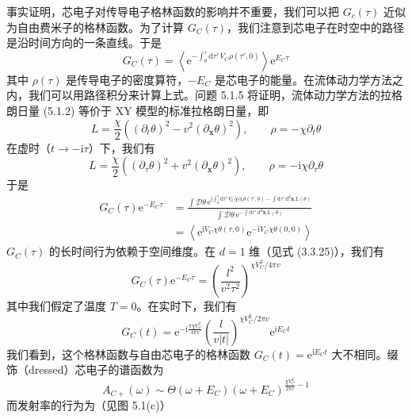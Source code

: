 事实证明，芯电子对传导电子格林函数的影响并不重要，我们可以把 $G_c(\tau)$ 近似为自由费米子的格林函数。为了计算 $G_C(\tau)$，我们注意到芯电子在时空中的路径是沿时间方向的一条直线。于是
\begin{equation*}
G_C(\tau)=\left\langle\mathrm{e}^{-\int_0^{\tau}\mathrm{d}\tau'\,V_C\rho(\tau',0)}\right\rangle\mathrm{e}^{E_C\tau}
\end{equation*}
其中 $\rho(\tau)$ 是传导电子的密度算符，$-E_C$ 是芯电子的能量。在流体动力学方法之内，我们可以用路径积分来计算上式。问题 5.1.5 将证明，流体动力学方法的拉格朗日量 (5.1.2) 等价于 XY 模型的标准拉格朗日量，即
\begin{equation*}
L=\frac{\chi}{2}\left((\partial_t\theta)^2-v^2(\partial_{\pmb{x}}\theta)^2\right),\qquad \rho=-\chi\partial_t\theta
\end{equation*}
在虚时（$t\to-\mathrm{i}\tau$）下，我们有
\begin{equation*}
L=\frac{\chi}{2}\left((\partial_\tau\theta)^2+v^2(\partial_{\pmb{x}}\theta)^2\right),\qquad \rho=-\mathrm{i}\chi\partial_\tau\theta
\end{equation*}
于是
\begin{align*}
G_C(\tau)\mathrm{e}^{-E_C\tau} &= \frac{\int\mathcal{D}\theta\,\mathrm{e}^{\mathrm{i}\int_0^{\tau}\mathrm{d}\tau'\,V_C\chi\partial_\tau\theta(\tau',0)-\int\mathrm{d}\tau'\,\mathrm{d}^d\pmb{x}\,L(\theta)}}{\int\mathcal{D}\theta\,\mathrm{e}^{-\int\mathrm{d}\tau'\,\mathrm{d}^d\pmb{x}\,L(\theta)}}\\
&= \left\langle\mathrm{e}^{\mathrm{i}V_C\chi\theta(\tau,0)}\mathrm{e}^{-\mathrm{i}V_C\chi\theta(0,0)}\right\rangle
\end{align*}
$G_C(\tau)$ 的长时间行为依赖于空间维度。在 $d=1$ 维（见式 (3.3.25)），我们有
\begin{equation*}
G_C(\tau)\mathrm{e}^{-E_C\tau}=\left(\frac{l^2}{v^2\tau^2}\right)^{\chi V_C^2/4\pi v}
\end{equation*}
其中我们假定了温度 $T=0$。在实时下，我们有
\begin{equation*}
G_C(t)=\mathrm{e}^{-\mathrm{i}\frac{\pi\chi V_C^2}{4\pi v}}\left(\frac{l}{v|t|}\right)^{\chi V_C^2/2\pi v}\mathrm{e}^{\mathrm{i}E_Ct}
\end{equation*}
我们看到，这个格林函数与自由芯电子的格林函数 $G_C(t)=\mathrm{e}^{\mathrm{i}E_Ct}$ 大不相同。缀饰（dressed）芯电子的谱函数为
\begin{equation*}
A_{C+}(\omega)\sim\Theta(\omega+E_C)(\omega+E_C)^{\frac{\chi V_C^2}{2\pi v}-1}
\end{equation*}
而发射率的行为为（见图 5.1(c)）
